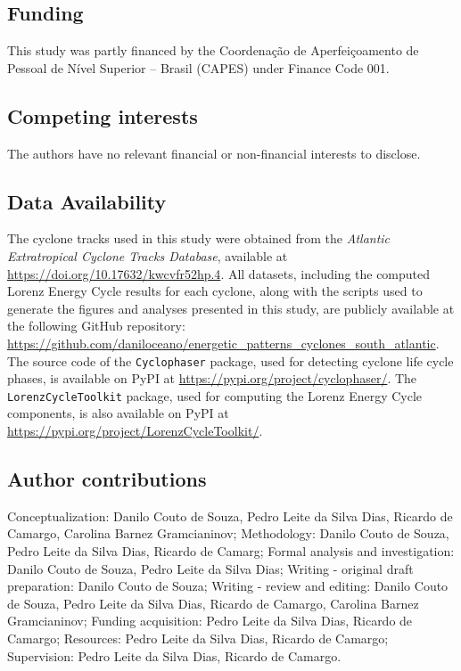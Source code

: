 \documentclass[pdflatex,sn-chicago]{sn-jnl}%
\theoremstyle{plain}
\theoremstyle{definition}
\theoremstyle{remark}
\theoremstyle{definition}
\begin{document}
\subsection*{Funding}

This study was partly financed by the Coordenação de Aperfeiçoamento de Pessoal de Nível Superior – Brasil (CAPES) under Finance Code 001.

\subsection*{Competing interests}

The authors have no relevant financial or non-financial interests to disclose.

\subsection*{Data Availability}

The cyclone tracks used in this study were obtained from the \textit{Atlantic Extratropical Cyclone Tracks Database}, available at \url{https://doi.org/10.17632/kwcvfr52hp.4}. All datasets, including the computed Lorenz Energy Cycle results for each cyclone, along with the scripts used to generate the figures and analyses presented in this study, are publicly available at the following GitHub repository: \url{https://github.com/daniloceano/energetic_patterns_cyclones_south_atlantic}. The source code of the \texttt{Cyclophaser} package, used for detecting cyclone life cycle phases, is available on PyPI at \url{https://pypi.org/project/cyclophaser/}. The \texttt{LorenzCycleToolkit} package, used for computing the Lorenz Energy Cycle components, is also available on PyPI at \url{https://pypi.org/project/LorenzCycleToolkit/}.

\subsection*{Author contributions}

Conceptualization: Danilo Couto de Souza, Pedro Leite da Silva Dias, Ricardo de Camargo, Carolina Barnez Gramcianinov; Methodology: Danilo Couto de Souza, Pedro Leite da Silva Dias, Ricardo de Camarg; Formal analysis and investigation: Danilo Couto de Souza, Pedro Leite da Silva Dias; Writing - original draft preparation: Danilo Couto de Souza; Writing - review and editing: Danilo Couto de Souza, Pedro Leite da Silva Dias, Ricardo de Camargo, Carolina Barnez Gramcianinov; Funding acquisition: Pedro Leite da Silva Dias, Ricardo de Camargo; Resources: Pedro Leite da Silva Dias, Ricardo de Camargo; Supervision: Pedro Leite da Silva Dias, Ricardo de Camargo.
\end{document}

